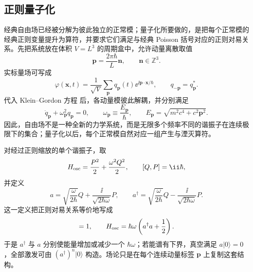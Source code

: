 \subsection{正则量子化}

经典自由场已经被分解为彼此独立的正常模；量子化所要做的，是把每个正常模的经典正则变量提升为算符，并要求它们满足与经典 Poisson 括号对应的正则对易关系。先把系统放在体积 $V=L^3$ 的周期盒中，允许动量离散取值
\begin{equation*}
 \mathbf p=\frac{2\pi\hbar}{L}\mathbf n,
 \qquad \mathbf n\in\mathbb Z^3.
\end{equation*}
实标量场可写成
\begin{equation*}
 \varphi(\mathbf x,t)
 =\frac1{\sqrt V}\sum_{\mathbf p}q_{\mathbf p}(t)
 \ee^{\ii\mathbf p\cdot\mathbf x/\hbar},
 \qquad q_{-\mathbf p}=q_{\mathbf p}^*.
\end{equation*}
代入 Klein--Gordon 方程  后，各动量模彼此解耦，并分别满足
\begin{equation}
 \ddot q_{\mathbf p}+\omega_{\mathbf p}^2q_{\mathbf p}=0,
 \qquad
 \omega_{\mathbf p}\equiv\frac{E_{\mathbf p}}{\hbar},
 \qquad
 E_{\mathbf p}=\sqrt{m^2c^4+c^2\mathbf p^2}.
 \label{eq:kg-mode-frequency-r2}
\end{equation}
因此，自由场不是一种全新的力学系统，而是无限多个频率不同的谐振子在连续极限下的集合；量子化以后，每个正常模自然对应一组产生与湮灭算符。

对经过正则缩放的单个谐振子，取
\begin{equation*}
 H_{\rm osc}=\frac{P^2}{2}+\frac{\omega^2Q^2}{2},
 \qquad [Q,P]=\ii\hbar,
\end{equation*}
并定义
\begin{equation}
 a=\sqrt{\frac{\omega}{2\hbar}}Q
 +\frac{\ii}{\sqrt{2\hbar\omega}}P,
 \qquad
 a^\dagger=\sqrt{\frac{\omega}{2\hbar}}Q
 -\frac{\ii}{\sqrt{2\hbar\omega}}P.
 \label{eq:sho-ladder-r3}
\end{equation}
这一定义把正则对易关系等价地写成
\begin{equation}
 [a,a^\dagger]=1,
 \qquad
 H_{\rm osc}=\hbar\omega\left(a^\dagger a+\frac12\right).
 \label{eq:sho-H-r3}
\end{equation}
于是 $a^\dagger$ 与 $a$ 分别使能量增加或减少一个 $\hbar\omega$；若能谱有下界，真空满足 $a|0\rangle=0$，全部激发可由 $(a^\dagger)^n|0\rangle$ 构造。场论只是在每个连续动量标签 $\mathbf p$ 上复制这套结构。


